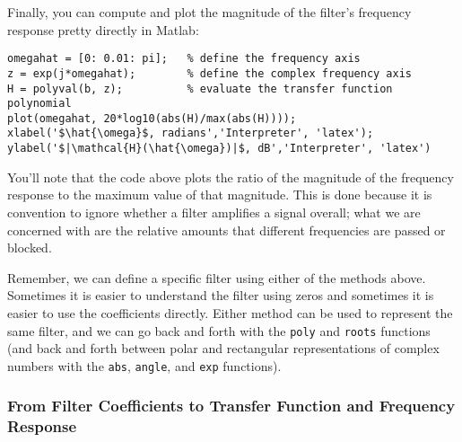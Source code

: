 Finally, you can compute and plot the magnitude of the filter's
frequency response pretty directly in Matlab:
\begin{lstlisting}[style=Matlab-editor,basicstyle=\mlttfamily\small]
omegahat = [0: 0.01: pi];   % define the frequency axis
z = exp(j*omegahat);        % define the complex frequency axis
H = polyval(b, z);          % evaluate the transfer function polynomial
plot(omegahat, 20*log10(abs(H)/max(abs(H))));
xlabel('$\hat{\omega}$, radians','Interpreter', 'latex');
ylabel('$|\mathcal{H}(\hat{\omega})|$, dB','Interpreter', 'latex')
\end{lstlisting}
You'll note that the code above plots the ratio of the magnitude of
the frequency response to the maximum value of that magnitude. This is
done because it is convention to ignore whether a filter amplifies a
signal overall; what we are concerned with are the relative amounts
that different frequencies are passed or blocked.


Remember, we can define a specific filter using either of the methods
above. Sometimes it is easier to understand the filter using zeros and
sometimes it is easier to use the coefficients directly.  Either
method can be used to represent the same filter, and we can go back
and forth with the \verb|poly| and \verb|roots| functions (and back
and forth between polar and rectangular representations of complex
numbers with the \verb|abs|, \verb|angle|, and \verb|exp| functions).


\subsubsection{From Filter Coefficients to Transfer Function and Frequency Response}

